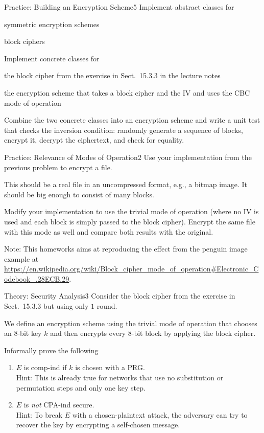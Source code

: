 \documentclass[a4paper]{article}
\begin{document}
\header

\begin{problem}{Practice: Building an Encryption Scheme}{5}
Implement abstract classes for
\begin{compactitem}
 \item symmetric encryption schemes
 \item block ciphers
\end{compactitem}

Implement concrete classes for
\begin{compactitem}
 \item the block cipher from the exercise in Sect.~15.3.3 in the lecture notes
 \item the encryption scheme that takes a block cipher and the IV and uses the CBC mode of operation
\end{compactitem}

Combine the two concrete classes into an encryption scheme and write a unit test that checks the inversion condition: randomly generate a sequence of blocks, encrypt it, decrypt the ciphertext, and check for equality.
\end{problem}

\begin{problem}{Practice: Relevance of Modes of Operation}{2}
Use your implementation from the previous problem to encrypt a file.

This should be a real file in an uncompressed format, e.g., a bitmap image.
It should be big enough to consist of many blocks.

Modify your implementation to use the trivial mode of operation (where no IV is used and each block is simply passed to the block cipher).
Encrypt the same file with this mode as well and compare both results with the original.

Note: This homeworks aims at reproducing the effect from the penguin image example at \url{https://en.wikipedia.org/wiki/Block_cipher_mode_of_operation#Electronic_Codebook_.28ECB.29}.
\end{problem}

\begin{problem}{Theory: Security Analysis}{3}
Consider the block cipher from the exercise in Sect.~15.3.3 but using only $1$ round.

We define an encryption scheme using the trivial mode of operation that chooses an $8$-bit key $k$ and then encrypts every $8$-bit block by applying the block cipher.

Informally prove the following
\begin{enumerate}
  \item $E$ is comp-ind if $k$ is chosen with a PRG.\\
    Hint: This is already true for networks that use no substitution or permutation steps and only one key step.
  \item $E$ is \emph{not} CPA-ind secure.\\
   Hint: To break $E$ with a chosen-plaintext attack, the adversary can try to recover the key by encrypting a self-chosen message.
\end{enumerate}
\end{problem}
\end{document}
